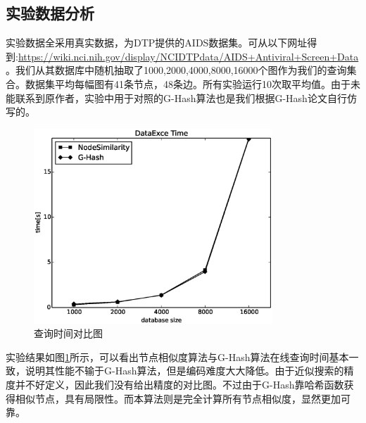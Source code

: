\documentclass{XDBAthesis}
\begin{document}
\subsection{实验数据分析}
实验数据全采用真实数据，为DTP提供的AIDS数据集。可从以下网址得到:\url{https://wiki.nci.nih.gov/display/NCIDTPdata/AIDS+Antiviral+Screen+Data}。我们从其数据库中随机抽取了1000,2000,4000,8000,16000个图作为我们的查询集合。数据集平均每幅图有41条节点，48条边。所有实验运行10次取平均值。由于未能联系到原作者，实验中用于对照的G-Hash算法也是我们根据G-Hash论文\cite{ghash}自行仿写的。
\begin{figure}[htb]
    \centering
    \includegraphics[width=0.8\textwidth]{../figures/THC/G-Hashcomapre}
    \caption{查询时间对比图}
    \label{fg:ghashtime}
\end{figure}

实验结果如图\ref{fg:ghashtime}所示，可以看出节点相似度算法与G-Hash算法在线查询时间基本一致，说明其性能不输于G-Hash算法，但是编码难度大大降低。由于近似搜索的精度并不好定义，因此我们没有给出精度的对比图。不过由于G-Hash靠哈希函数获得相似节点，具有局限性。而本算法则是完全计算所有节点相似度，显然更加可靠。

\ifx\allfiles\undefined
%

\end{document}
